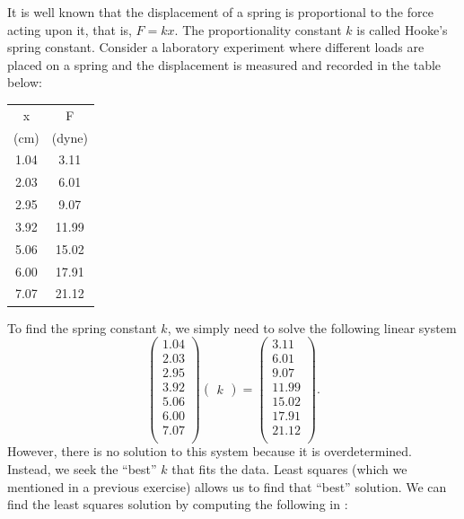 It is well known that the displacement of a spring is proportional to the force acting upon it, that is, $F = k x$.  The proportionality constant $k$ is called Hooke's spring constant.  Consider a laboratory experiment where different loads are placed on a spring and the displacement is measured and recorded in the table below:
\vspace{5mm}\\
\begin{center}
\begin{tabular}{|c|c|}
	\hline
x & F \\
(cm) & (dyne)\\
\hline
1.04  & 3.11 \\
2.03  &  6.01\\
2.95  &  9.07\\
3.92  &  11.99\\
5.06  &  15.02\\
6.00  &  17.91\\
7.07  &  21.12\\
\hline
\end{tabular}
\end{center}
\vspace{5mm}
To find the spring constant $k$, we simply need to solve the following linear system
\[
\begin{pmatrix}
1.04\\
2.03\\
2.95\\
3.92\\
5.06\\
6.00\\
7.07\\
\end{pmatrix}
\begin{pmatrix}k\end{pmatrix} = 
\begin{pmatrix}
3.11 \\
6.01\\
9.07\\
11.99\\
15.02\\
17.91\\
21.12\\
\end{pmatrix}.
\]
However, there is no solution to this system because it is overdetermined.  Instead, we seek the ``best'' $k$ that fits the data.  Least squares (which we mentioned in a previous exercise) allows us to find that ``best'' solution. We can find the least squares solution by computing the following in \ProgrammingLanguage:
